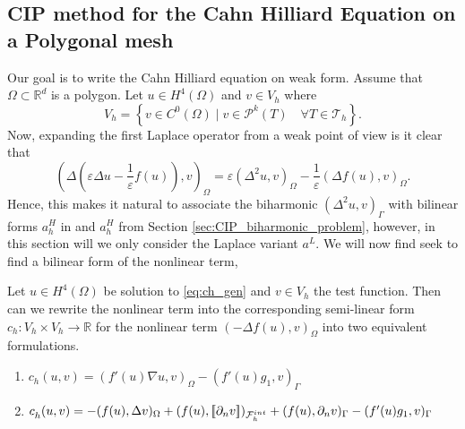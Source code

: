 \subsection{ CIP method for the Cahn Hilliard Equation on a Polygonal mesh}%
\label{sub:writing_the_cahn_hilliard_equation_of_weak_form}

Our goal is to write the Cahn Hilliard equation on weak form.
Assume that $\Omega  \subset \mathbb{R} ^{d}$ is a polygon.
 Let $u \in  H^{4}( \Omega ) $ and $v \in V_{h} $ where
\[
V_{h} = \left\{ v \in C^{0}( \Omega )   \mid v\in \mathcal{P} ^{k} ( T) \quad \forall T \in \mathcal{T} _{h} \right\}.
\]
Now, expanding the first Laplace operator from a weak point of view is it clear that
\[
 ( \Delta ( \varepsilon  \Delta u - \frac{1}{\varepsilon } f( u) ) ,v )_{\Omega } = \varepsilon ( \Delta^{2} u ,v )_{\Omega } - \frac{1}{\varepsilon } ( \Delta f( u)  ,v )_{\Omega }.
\]
Hence, this makes it natural to associate the biharmonic $( \Delta ^2 u,v)_{\Gamma } $ with bilinear forms $a_h^{H} $ in  and $a^{H}_{h} $ from Section \ref{sec:CIP_biharmonic_problem}, however, in this section will we only consider the Laplace
variant $a^{L}$.
We will now find seek to find a bilinear form of the nonlinear term,

\begin{lemma}
    Let $u \in H^4( \Omega ) $ be solution to \eqref{eq:ch_gen} and $v \in V_{h}$ the test function.
Then can we rewrite the nonlinear term into the corresponding semi-linear form $c_{h}:V_{h} \times  V_{h} \to \mathbb{R} $  for the nonlinear term $( -\Delta f( u) , v)_{\Omega }$ into two equivalent formulations.
\begin{enumerate}[label=\arabic*)]
    \item  $c^{}_{h} ( u,v)  = ( f' ( u) \nabla u, v )_{\Omega }  - ( f'( u)  g_{1}   ,  v)_{\Gamma }$
    \item
        $c^{}_{h} ( u,v)  = -( f( u), \Delta v )_{\Omega }+  ( f( u) , \left[\!\left[  \partial _{n}v  \right]\!\right]  )_{\mathcal{F} _{h}^{int}} + ( f(u), \partial _{n} v)_{\Gamma  }  - ( f'( u)  g_{1}   ,  v)_{\Gamma }$
\end{enumerate}

\end{lemma}

